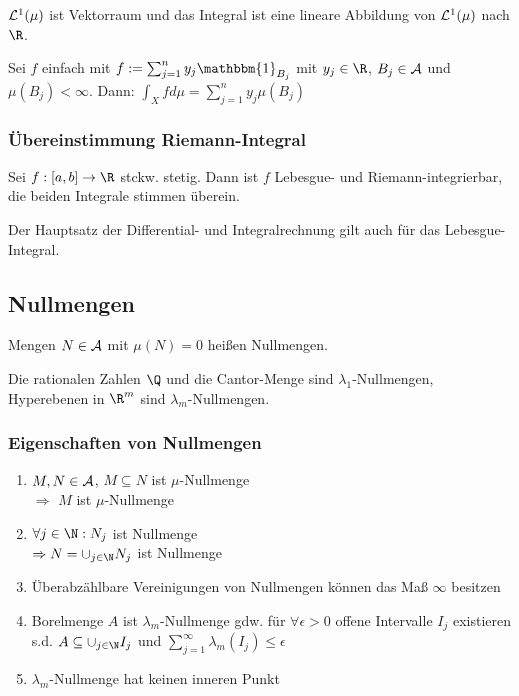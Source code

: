 $\mathcal{L}^1(\mu)$ ist Vektorraum und das Integral ist eine lineare Abbildung von $\mathcal{L}^1(\mu)$ nach $\R$.

\vspace{2mm}

Sei $f$ einfach mit $f := \sum_{j=1}^n y_j \mathbbm{1}_{B_j}$ mit $y_j \in \R$, $B_j \in \mathcal{A}$ und $\mu(B_j) < \infty$. Dann: $\int_X f d\mu = \sum_{j=1}^n y_j \mu(B_j)$

\subsubsection*{Übereinstimmung Riemann-Integral}

Sei $f : [a,b] \to \R$ stckw. stetig. Dann ist $f$ Lebesgue- und Riemann-integrierbar, die beiden Integrale stimmen überein.

Der Hauptsatz der Differential- und Integralrechnung gilt auch für das Lebesgue-Integral.

\subsection*{Nullmengen}

Mengen $N \in \mathcal{A}$ mit $\mu(N) = 0$ heißen Nullmengen.

Die rationalen Zahlen $\Q$ und die Cantor-Menge sind $\lambda_1$-Nullmengen, Hyperebenen in $\R^m$ sind $\lambda_m$-Nullmengen.

\subsubsection*{Eigenschaften von Nullmengen}

\begin{enumerate}[label=(\alph*)]
	\item $M, N \in \mathcal{A}$, $M \subseteq N$ ist $\mu$-Nullmenge \\ $\Rightarrow$ $M$ ist $\mu$-Nullmenge
	\item $\forall j \in \N : N_j$ ist Nullmenge \\ $\Rightarrow N = \cup_{j \in \N} N_j$ ist Nullmenge
	\item Überabzählbare Vereinigungen von Nullmengen können das Maß $\infty$ besitzen
	\item Borelmenge $A$ ist $\lambda_m$-Nullmenge gdw. für $\forall \epsilon > 0$  offene Intervalle $I_j$ existieren s.d. $A \subseteq \cup_{j \in \N} I_j$ und $\sum_{j=1}^\infty \lambda_m(I_j) \leq \epsilon$
	\item $\lambda_m$-Nullmenge hat keinen inneren Punkt
\end{enumerate}


